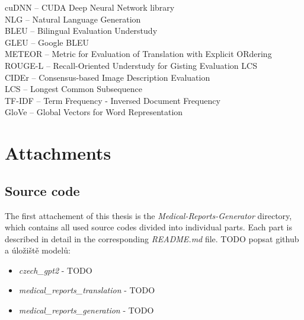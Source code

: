 \documentclass[12pt,a4paper]{report}
\begin{document}
cuDNN -- CUDA Deep Neural Network library\\
NLG -- Natural Language Generation\\
BLEU -- Bilingual Evaluation Understudy\\
GLEU -- Google BLEU\\
METEOR -- Metric for Evaluation of Translation with Explicit ORdering\\
ROUGE-L -- Recall-Oriented Understudy for Gisting Evaluation LCS\\
CIDEr -- Consensus-based Image Description Evaluation\\
LCS -- Longest Common Subsequence\\
TF-IDF -- Term Frequency - Inversed Document Frequency\\
GloVe -- Global Vectors for Word Representation

\appendix
\chapter{Attachments}

\section{Source code}
\label{add:Codes}
The first attachement of this thesis is the \textit{Medical-Reports-Generator} directory, which contains all used source codes divided into individual parts. Each part is described in detail in the corresponding \textit{README.md} file. TODO popsat github a úložiště modelů:
\begin{itemize}
	\item \textit{czech\_gpt2} - TODO
	\item \textit{medical\_reports\_translation} - TODO
	\item \textit{medical\_reports\_generation} - TODO
\end{itemize}
\end{document}
